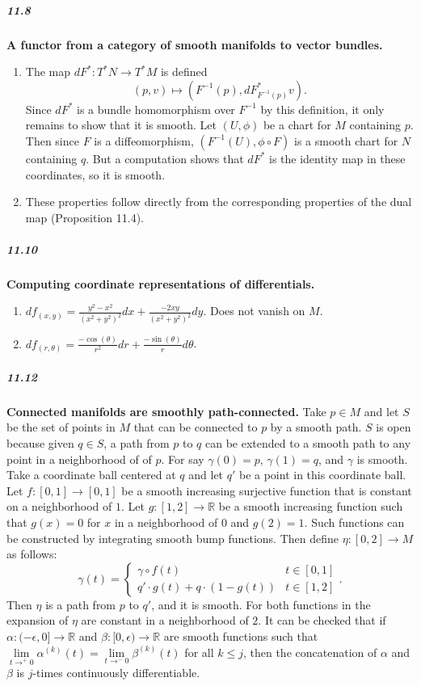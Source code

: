 \documentclass[10pt,letter]{article}
\begin{document}
\subparagraph*{11.8} {\bf A functor from a category of smooth manifolds to vector bundles.} 
\begin{enumerate}
\item The map $dF^{\ast}: T^{\ast}N \rightarrow T^{\ast}M$ is defined \[ (p,v)  \mapsto (F^{-1}(p),dF^{\ast}_{F^{-1}(p)}v). \] Since $dF^{\ast}$ is a bundle homomorphism over $F^{-1}$ by this definition, it only remains to show that it is smooth. Let $(U,\phi)$ be a chart for $M$ containing $p$. Then since $F$ is a diffeomorphism, $(F^{-1}(U),\phi \circ F)$ is a smooth chart for $N$ containing $q$. But a computation shows that $dF^{\ast}$ is the identity map in these coordinates, so it is smooth.
\item These properties follow directly from the corresponding properties of the dual map (Proposition 11.4). 
\end{enumerate}

\subparagraph*{11.10} {\bf Computing coordinate representations of differentials.}
\begin{enumerate}
\item $df_{(x,y)} = \frac{y^2-x^2}{(x^2+y^2)^2} dx + \frac{-2xy}{(x^2+y^2)^2} dy$. Does not vanish on $M$. 
\item $df_{(r,\theta)} = \frac{-\cos(\theta)}{r^2} dr + \frac{-\sin(\theta)}{r} d\theta$. 
\end{enumerate}

\subparagraph*{11.12} {\bf Connected manifolds are smoothly path-connected.} Take $p \in M$ and let $S$ be the set of points in $M$ that can be connected to $p$ by a smooth path. $S$ is open because given $q \in S$, a path from $p$ to $q$ can be extended to a smooth path to any point in a neighborhood of of $p$. For say $\gamma(0) = p$, $\gamma(1) = q$, and $\gamma$ is smooth. Take a coordinate ball centered at $q$ and let $q'$ be a point in this coordinate ball. Let $f: [0,1] \rightarrow [0,1]$ be a smooth increasing surjective function that is constant on a neighborhood of $1$. Let $g: [1,2] \rightarrow \mathbb{R}$ be a smooth increasing function such that $g(x) = 0$ for $x$ in a neighborhood of $0$ and $g(2) = 1$. Such functions can be constructed by integrating smooth bump functions. Then define $\eta: [0,2] \rightarrow M$ as follows: \[ \gamma(t) = \begin{cases} \gamma \circ f(t) & t \in [0,1] \\ q' \cdot g(t) + q \cdot (1-g(t)) & t \in [1,2] \end{cases}. \] Then $\eta$ is a path from $p$ to $q'$, and it is smooth. For both functions in the expansion of $\eta$ are constant in a neighborhood of $2$. It can be checked that if $\alpha: (-\epsilon,0] \rightarrow \mathbb{R}$ and $\beta: [0,\epsilon) \rightarrow \mathbb{R}$ are smooth functions such that $\lim \limits_{t \rightarrow^+ 0} \alpha^{(k)}(t) = \lim \limits_{t \rightarrow^- 0} \beta^{(k)}(t)$ for all $k \leq j$, then the concatenation of $\alpha$ and $\beta$ is $j$-times continuously differentiable. 
\end{document}
